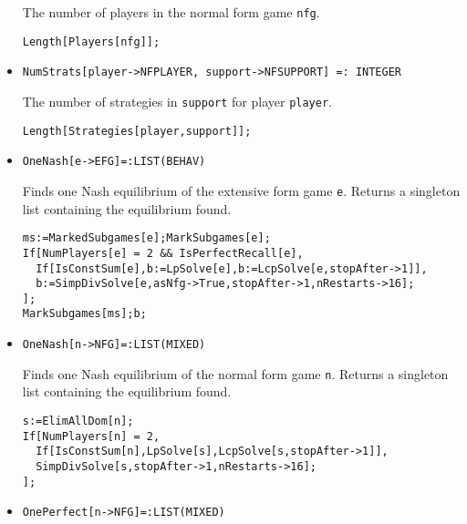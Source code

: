 \begin{itemize}
\bd 
The number of players in the normal form game \verb+nfg+.
\begin{verbatim}
Length[Players[nfg]];
\end{verbatim} 
\ed

\item{}
\protect \large \begin{verbatim}
NumStrats[player->NFPLAYER, support->NFSUPPORT] =: INTEGER
\end{verbatim}\normalsize

\bd 
The number of strategies in \verb+support+ for player \verb+player+.
\begin{verbatim}
Length[Strategies[player,support]]; 
\end{verbatim} 
\ed

\item{}
\protect \large \begin{verbatim}
OneNash[e->EFG]=:LIST(BEHAV)
\end{verbatim}\normalsize

\bd 
Finds one Nash equilibrium of the extensive form game \verb+e+.
Returns a singleton list containing the equilibrium found.

\begin{verbatim}
ms:=MarkedSubgames[e];MarkSubgames[e];
If[NumPlayers[e] = 2 && IsPerfectRecall[e],
  If[IsConstSum[e],b:=LpSolve[e],b:=LcpSolve[e,stopAfter->1]],
  b:=SimpDivSolve[e,asNfg->True,stopAfter->1,nRestarts->16];
];
MarkSubgames[ms];b;
\end{verbatim} 
\ed

\item{}
\protect \large \begin{verbatim}
OneNash[n->NFG]=:LIST(MIXED)
\end{verbatim}\normalsize

\bd 
Finds one Nash equilibrium of the normal form game \verb+n+.
Returns a singleton list containing the equilibrium found.

\begin{verbatim}
s:=ElimAllDom[n];
If[NumPlayers[n] = 2,
  If[IsConstSum[n],LpSolve[s],LcpSolve[s,stopAfter->1]],
  SimpDivSolve[s,stopAfter->1,nRestarts->16];
];
\end{verbatim} 
\ed

\item{}
\protect \large \begin{verbatim}
OnePerfect[n->NFG]=:LIST(MIXED)
\end{verbatim}\normalsize


\end{itemize}
